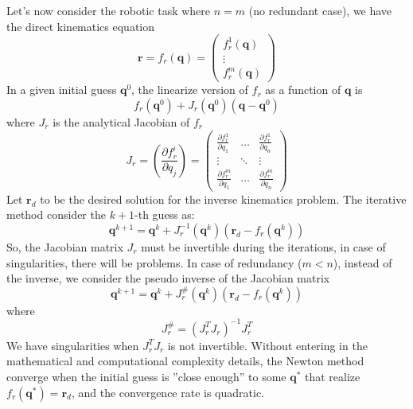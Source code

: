 \documentclass[10pt, letterpaper]{report}
\begin{document}
Let's now consider the robotic task where $n=m$ (no redundant case), we have the direct kinematics equation\begin{equation}
    \mathbf r = f_r(\mathbf q)=\begin{pmatrix}
        f^1_r(\mathbf q)\\ \vdots \\ f^m_r(\mathbf q)
    \end{pmatrix}
\end{equation}
In a given initial guess $\mathbf q^0$, the linearize version of $f_r$ as a function of $\mathbf q$ is
\begin{equation}
    f_r(\mathbf q^0)+J_r(\mathbf q^0)(\mathbf q -\mathbf q^0)
\end{equation}
where $J_r$ is the analytical Jacobian of $f_r$\begin{equation}
    J_r=\left( \frac{\partial f^i_r}{\partial q_j} \right)=\begin{pmatrix}
         \frac{\partial f^1_r}{\partial q_1}&\dots &  \frac{\partial f^1_r}{\partial q_n}\\ 
         \vdots & \ddots & \vdots \\
          \frac{\partial f^m_r}{\partial q_1}&\dots &  \frac{\partial f^m_r}{\partial q_n}
    \end{pmatrix} 
\end{equation}
Let $\mathbf r_d$ to be the desired solution for the inverse kinematics problem. The iterative method consider the $k+1$-th guess as:\begin{equation}
    \mathbf q^{k+1}=\mathbf q^k+J_r^{-1}(\mathbf q^k)(\mathbf r_d-f_r(\mathbf q^k))
\end{equation}
So, the Jacobian matrix $J_r$ must be invertible during the iterations, in case of singularities, there will be problems. In case of redundancy ($m<n$), instead of the inverse, we consider the pseudo inverse of the Jacobian matrix
\begin{equation}
    \mathbf q^{k+1}=\mathbf q^k+J_r^{\#}(\mathbf q^k)(\mathbf r_d-f_r(\mathbf q^k))
\end{equation}
where\begin{equation}
    J_r^{\#}=(J_r^TJ_r)^{-1}J_r^T
\end{equation}
We have singularities when $J_r^TJ_r$ is not invertible. Without entering in the mathematical and computational complexity details, the Newton method converge when the initial guess is ''close enough'' to some $\mathbf q^*$ that realize $f_r(\mathbf q^*)=\mathbf r_d$, and the convergence rate is quadratic.\bigskip 
\end{document}
